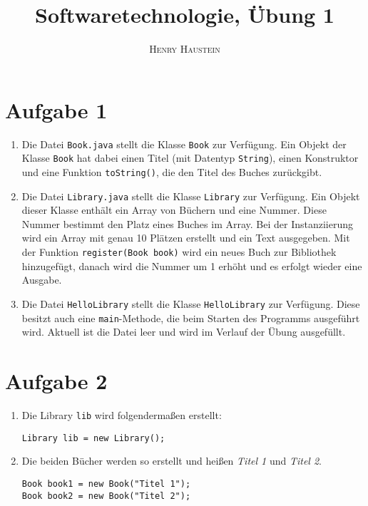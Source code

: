 \documentclass{article}
\title{\textbf{Softwaretechnologie, Übung 1}}
\author{\textsc{Henry Haustein}}
\date{}
\begin{document}
	\maketitle
	
	\section*{Aufgabe 1}
	\begin{enumerate}[label=(\alph*)]
		\item Die Datei \texttt{Book.java} stellt die Klasse \texttt{Book} zur Verfügung. Ein Objekt der Klasse \texttt{Book} hat dabei einen Titel (mit Datentyp \texttt{String}), einen Konstruktor und eine Funktion \texttt{toString()}, die den Titel des Buches zurückgibt.
		\item Die Datei \texttt{Library.java} stellt die Klasse \texttt{Library} zur Verfügung. Ein Objekt dieser Klasse enthält ein Array von Büchern und eine Nummer. Diese Nummer bestimmt den Platz eines Buches im Array. Bei der Instanziierung wird ein Array mit genau 10 Plätzen erstellt und ein Text ausgegeben. Mit der Funktion \texttt{register(Book book)} wird ein neues Buch zur Bibliothek hinzugefügt, danach wird die Nummer um 1 erhöht und es erfolgt wieder eine Ausgabe.
		\item Die Datei \texttt{HelloLibrary} stellt die Klasse \texttt{HelloLibrary} zur Verfügung. Diese besitzt auch eine \texttt{main}-Methode, die beim Starten des Programms ausgeführt wird. Aktuell ist die Datei leer und wird im Verlauf der Übung ausgefüllt.
	\end{enumerate}

	\section*{Aufgabe 2}
	\begin{enumerate}[label=(\alph*)]
		\item Die Library \texttt{lib} wird folgendermaßen erstellt:
		\begin{lstlisting}[style=java]
Library lib = new Library();
		\end{lstlisting}
		\item Die beiden Bücher werden so erstellt und heißen \textit{Titel 1} und \textit{Titel 2}.
		\begin{lstlisting}[style=java]
Book book1 = new Book("Titel 1");
Book book2 = new Book("Titel 2");
		\end{lstlisting}
	\end{enumerate}
\end{document}
